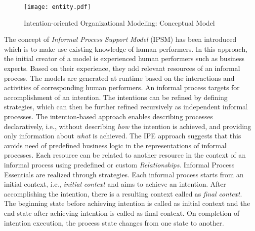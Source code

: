 \begin{figure}
	\centering
	\texttt{[image: entity.pdf]}
	\caption{Intention-oriented Organizational Modeling: Conceptual Model}
	\label{fig:entitymodel}
\end{figure}

The concept of \textit{Informal Process Support Model} (IPSM) \cite{Sungur2014a} has been introduced which is to make use existing knowledge of human performers. In this approach, the initial creator of a model is experienced human performers such as business experts. Based on their experience, they add relevant  resources of an informal process. The models are generated at runtime based on the interactions and activities of corresponding human performers. An informal process targets for accomplishment of an intention. The intentions can be refined by defining strategies, which can then be further refined recursively as independent informal processes. The intention-based approach enables describing processes declaratively, i.e., without describing \textit{how} the intention is achieved, and providing only information about \textit{what} is achieved. The IPE approach \cite{Sungur2014a} suggests that this avoids need of predefined business logic in the representations of informal processes. Each resource can be related to another resource in the context of an informal process using predefined or custom \textit{Relationships}. Informal Process Essentials are realized through strategies. Each informal process starts from an initial context, i.e., \textit{initial context} and aims to achieve an intention. After accomplishing the intention, there is a resulting context called as \textit{final context}. The beginning state before achieving intention is called as initial context and the end state after achieving intention is called as final context. On completion of intention execution, the process state changes from one state to another.

